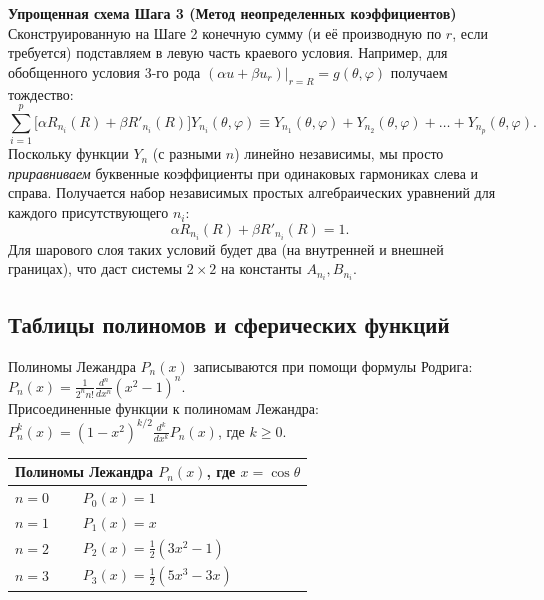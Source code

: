 \documentclass[a4paper,10pt]{article}
\begin{document}
\textbf{Упрощенная схема Шага 3 (Метод неопределенных коэффициентов)} \\
Сконструированную на Шаге 2 конечную сумму (и её производную по $r$, если требуется) подставляем в левую часть краевого условия. 
Например, для обобщенного условия 3-го рода $\left.(\alpha u + \beta u_r)\right|_{r=R} = g(\theta, \varphi)$ получаем тождество:
\[ \sum_{i=1}^p \Big[ \alpha R_{n_i}(R) + \beta R'_{n_i}(R) \Big] Y_{n_i}(\theta, \varphi) \equiv Y_{n_1}(\theta, \varphi) + Y_{n_2}(\theta, \varphi) + \dots + Y_{n_p}(\theta, \varphi). \]
Поскольку функции $Y_n$ (с разными $n$) линейно независимы, мы просто \textit{приравниваем} буквенные коэффициенты при одинаковых гармониках слева и справа. 
Получается набор независимых простых алгебраических уравнений для каждого присутствующего $n_i$:
\[ \alpha R_{n_i}(R) + \beta R'_{n_i}(R) = 1. \]
Для шарового слоя таких условий будет два (на внутренней и внешней границах), что даст системы $2 \times 2$ на константы $A_{n_i}, B_{n_i}$.

\newpage
\subsection*{Таблицы полиномов и сферических функций}

Полиномы Лежандра $P_n(x)$ записываются при помощи формулы Родрига: $P_n(x) = \frac{1}{2^n n!} \frac{d^n}{dx^n} (x^2 - 1)^n$. \\
Присоединенные функции к полиномам Лежандра: $P_n^k(x) = (1-x^2)^{k/2} \frac{d^k}{dx^k} P_n(x)$, где $k \ge 0$.

\vspace{0.3cm}
\begin{center}
\renewcommand{\arraystretch}{1.5}
\begin{tabular}{ll}
\hline
\multicolumn{2}{c}{\textbf{Полиномы Лежандра $P_n(x)$, где $x = \cos\theta$}} \\
\hline
$n=0$ & $P_0(x) = 1$ \\
$n=1$ & $P_1(x) = x$ \\
$n=2$ & $P_2(x) = \frac{1}{2}(3x^2 - 1)$ \\
$n=3$ & $P_3(x) = \frac{1}{2}(5x^3 - 3x)$ \\
\hline
\end{tabular}
\end{center}
\end{document}
